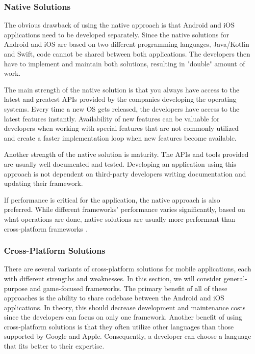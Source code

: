 \subsubsection{Native Solutions}
The obvious drawback of using the native approach is that Android and iOS applications need to be developed separately. Since the native solutions for Android and iOS are based on two different programming languages, Java/Kotlin and Swift, code cannot be shared between both applications. The developers then have to implement and maintain both solutions, resulting in "double" amount of work.

The main strength of the native solution is that you always have access to the latest and greatest APIs provided by the companies developing the operating systems. Every time a new OS gets released, the developers have access to the latest features instantly. Availability of new features can be valuable for developers when working with special features that are not commonly utilized and create a faster implementation loop when new features become available.

Another strength of the native solution is maturity. The APIs and tools provided are usually well documented and tested. Developing an application using this approach is not dependent on third-party developers writing documentation and updating their framework. 

If performance is critical for the application, the native approach is also preferred. While different frameworks’ performance varies significantly, based on what operations are done, native solutions are usually more performant than cross-platform frameworks \citep{biorn-hansen_empirical_2020}.

\subsubsection{Cross-Platform Solutions}
There are several variants of cross-platform solutions for mobile applications, each with different strengths and weaknesses. In this section, we will consider general-purpose and game-focused frameworks. The primary benefit of all of these approaches is the ability to share codebase between the Android and iOS applications. In theory, this should decrease development and maintenance costs since the developers can focus on only one framework. Another benefit of using cross-platform solutions is that they often utilize other languages than those supported by Google and Apple. Consequently, a developer can choose a language that fits better to their expertise.

